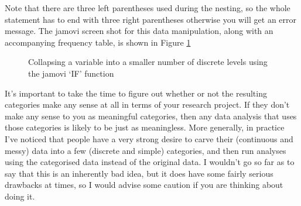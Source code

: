 \noindent
{} 

Note that there are three left parentheses used during the nesting, so the whole statement has to end with three right parentheses otherwise you will get an error message. The jamovi screen shot for this data manipulation, along with an accompanying frequency table, is shown in Figure \ref{fig:agecats} 

\begin{figure}[!!htb]
\begin{center}
\caption{Collapsing a variable into a smaller number of discrete levels using the jamovi `IF' function}
\label{fig:agecats}
\HR
\end{center}
\end{figure}

It's important to take the time to figure out whether or not the resulting categories make any sense at all in terms of your research project. If they don't make any sense to you as meaningful categories, then any data analysis that uses those categories is likely to be just as meaningless. More generally, in practice I've noticed that people have a very strong desire to carve their (continuous and messy) data into a few (discrete and simple) categories, and then run analyses using the categorised data instead of the original data. I wouldn't go so far as to say that this is an inherently bad idea, but it does have some fairly serious drawbacks at times, so I would advise some caution if you are thinking about doing it. 



